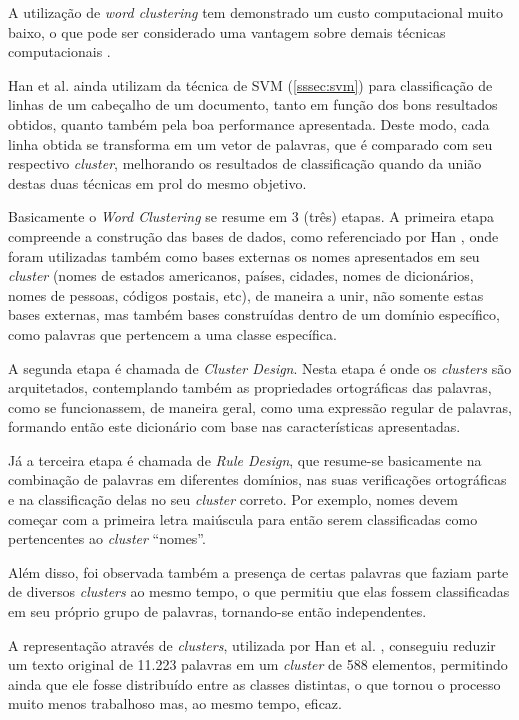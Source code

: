A utilização de \textit{word clustering} tem demonstrado um custo computacional muito baixo, o que pode ser considerado uma vantagem sobre demais técnicas computacionais \cite{Han-Giles-WC}.

Han et al. ainda utilizam da técnica de SVM (\autoref{sssec:svm}) para classificação de linhas de um cabeçalho de um documento, tanto em função dos bons resultados obtidos, quanto também pela boa performance apresentada. Deste modo, cada linha obtida se transforma em um vetor de palavras, que é comparado com seu respectivo \textit{cluster}, melhorando os resultados de classificação quando da união destas duas técnicas em prol do mesmo objetivo.

Basicamente o \textit{Word Clustering} se resume em 3 (três) etapas. A primeira etapa compreende a construção das bases de dados, como referenciado por Han \cite{Han-SVM}, onde foram utilizadas também como bases externas os nomes apresentados em seu \textit{cluster} (nomes de estados americanos, países, cidades, nomes de dicionários, nomes de pessoas, códigos postais, etc), de maneira a unir, não somente estas bases externas, mas também bases construídas dentro de um domínio específico, como palavras que pertencem a uma classe específica.

A segunda etapa é chamada de \textit{Cluster Design}. Nesta etapa é onde os \textit{clusters} são arquitetados, contemplando também as propriedades ortográficas das palavras, como se funcionassem, de maneira geral, como uma expressão regular de palavras, formando então este dicionário com base nas características apresentadas.

Já a terceira etapa é chamada de \textit{Rule Design}, que resume-se basicamente na combinação de palavras em diferentes domínios, nas suas verificações ortográficas e na classificação delas no seu \textit{cluster} correto. Por exemplo, nomes devem começar com a primeira letra maiúscula para então serem classificadas como pertencentes ao \textit{cluster} ``nomes''.

Além disso, foi observada também a presença de certas palavras que faziam parte de diversos \textit{clusters} ao mesmo tempo, o que permitiu que elas fossem classificadas em seu próprio grupo de palavras, tornando-se então independentes.

A representação através de \textit{clusters}, utilizada por Han et al. \cite{Han-Giles-WC}, conseguiu reduzir um texto original de 11.223 palavras em um \textit{cluster} de 588 elementos, permitindo ainda que ele fosse distribuído entre as classes distintas, o que tornou o processo muito menos trabalhoso mas, ao mesmo tempo, eficaz.

